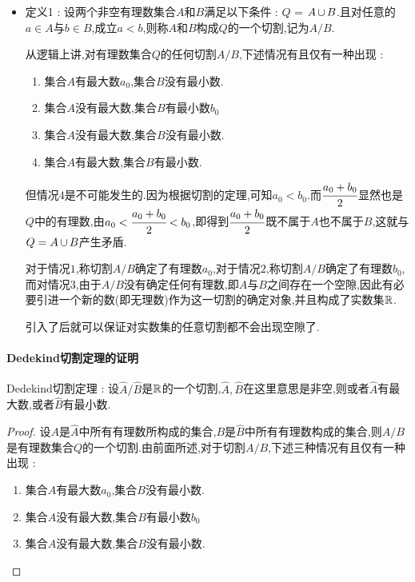 {{{{    \begin{itemize}
        \item {
              定义1 : 设两个非空有理数集合$A$和$B$满足以下条件 : $Q$ = $A \operatorname{\cup} B$.且对任意的$a \in A$与$b \in B$,成立$a < b$,则称$A$和$B$构成$Q$的一个切割,记为$A/B$.

              从逻辑上讲,对有理数集合$Q$的任何切割$A/B$,下述情况有且仅有一种出现 : \begin{enumerate}
                  \item 集合$A$有最大数$a_0$,集合$B$没有最小数.
                  \item 集合$A$没有最大数,集合$B$有最小数$b_0$
                  \item 集合$A$没有最大数,集合$B$没有最小数.
                  \item 集合$A$有最大数,集合$B$有最小数.
              \end{enumerate}

              但情况$4$是不可能发生的.因为根据切割的定理,可知$a_0 < b_0$.而$\cfrac{a_0 + b_0}{2}$显然也是$Q$中的有理数,由$a_0 < \cfrac{a_0 +b_0}{2} < b_0$,即得到$\cfrac{a_0 + b_0}{2}$既不属于$A$也不属于$B$,这就与$Q = A \operatorname{\cup} B$产生矛盾.

              对于情况$1$,称切割$A/B$确定了有理数$a_0$,对于情况$2$,称切割$A/B$确定了有理数$b_0$,而对情况$3$,由于$A/B$没有确定任何有理数,即$A$与$B$之间存在一个空隙,因此有必要引进一个新的数(即无理数)作为这一切割的确定对象,并且构成了实数集$\operatorname{\mathbb{R}}$.

              引入了后就可以保证对实数集的任意切割都不会出现空隙了.
              }
    \end{itemize}

    \paragraph{Dedekind切割定理的证明}{
        Dedekind切割定理 : 设$\hat{A} / \hat{B}$是$\operatorname{\mathbb{R}}$的一个切割,$\hat{A},\hat{B}$在这里意思是非空,则或者$\hat{A}$有最大数,或者$\hat{B}$有最小数.

        \begin{proof}
            设$A$是$\hat{A}$中所有有理数所构成的集合,$B$是$\hat{B}$中所有有理数构成的集合,则$A/B$是有理数集合$Q$的一个切割.由前面所述,对于切割$A/B$,下述三种情况有且仅有一种出现 :
            \begin{enumerate}
                \item 集合$A$有最大数$a_0$,集合$B$没有最小数.
                \item 集合$A$没有最大数,集合$B$有最小数$b_0$
                \item 集合$A$没有最大数,集合$B$没有最小数.
            \end{enumerate}


\end{proof}}}}}}
